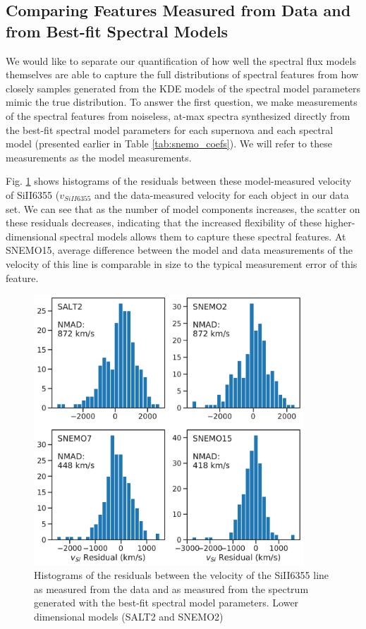 \subsection{Comparing Features Measured from Data and from Best-fit Spectral Models}
We would like to separate our quantification of how well the spectral flux models themselves are able to capture the full distributions of spectral features from how closely samples generated from the KDE models of the spectral model parameters mimic the true distribution. To answer the first question, we make measurements of the spectral features from noiseless, at-max spectra synthesized directly from the best-fit spectral model parameters for each supernova and each spectral model (presented earlier in Table \ref{tab:snemo_coefs}). We will refer to these measurements as the model measurements.

Fig. \ref{fig:model_vSi_recovery} shows histograms of the residuals between these model-measured velocity of SiII6355 ($v_{SiII6355}$ and the data-measured velocity for each object in our data set. We can see that as the number of model components increases, the scatter on these residuals decreases, indicating that the increased flexibility of these higher-dimensional spectral models allows them to capture these spectral features. At SNEMO15, average difference between the model and data measurements of the velocity of this line is comparable in size to the typical measurement error of this feature.

\begin{figure}
    \centering
    \includegraphics[width=0.9\textwidth]{figures/snemo_kde/model_vSi_recovery.pdf}
    \caption{Histograms of the residuals between the velocity of the SiII6355 line as measured from the data and as measured from the spectrum generated with the best-fit spectral model parameters. Lower dimensional models (SALT2 and SNEMO2) }
    \label{fig:model_vSi_recovery}
\end{figure}

